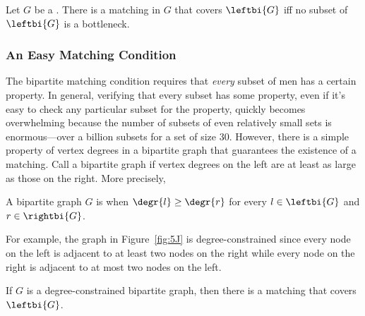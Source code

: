 \begin{theorem}\label{thm:halls}
  Let $G$ be a .  There is a matching in $G$ that
  covers $\leftbi{G}$ iff no subset of $\leftbi{G}$ is a bottleneck.
\end{theorem}

\subsubsection{An Easy Matching Condition}

The bipartite matching condition requires that \emph{every} subset of
men has a certain property.  In general, verifying that every subset
has some property, even if it's easy to check any particular subset
for the property, quickly becomes overwhelming because the number of
subsets of even relatively small sets is enormous---over a billion
subsets for a set of size 30.  However, there is a simple property of
vertex degrees in a bipartite graph that guarantees the existence of a
matching.  Call a bipartite graph 
if vertex degrees on the left are at least as large as those on the
right.  More precisely,

\begin{definition}\label{degree-constrained_def}
  A bipartite graph $G$ is  when $\degr{l} \geq
  \degr{r}$ for every $l \in \leftbi{G}$ and $r \in \rightbi{G}$.
\end{definition}

For example, the graph in Figure~\ref{fig:5J} is degree-constrained
since every node on the left is adjacent to at least two nodes on the
right while every node on the right is adjacent to at most two nodes
on the left.

\begin{theorem}\label{lem:no_bottleneck_degree_constrained}
  If $G$ is a degree-constrained bipartite graph, then there is a matching
  that covers~$\leftbi{G}$.
\end{theorem}

